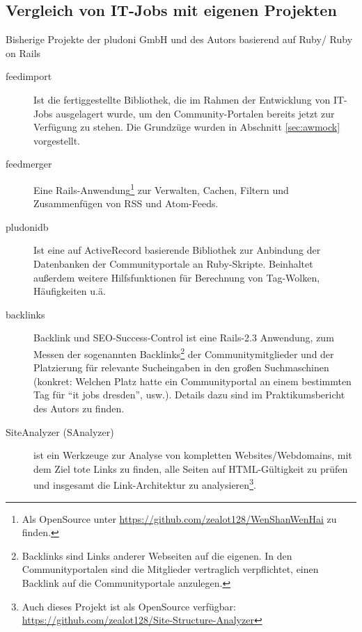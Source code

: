 \subsection{Vergleich von IT-Jobs mit eigenen Projekten}

Bisherige Projekte der pludoni GmbH und des Autors basierend auf Ruby/ Ruby on Rails
\begin{description}
 \item[feedimport] Ist die fertiggestellte Bibliothek, die im Rahmen der Entwicklung von IT-Jobs ausgelagert wurde, um den Community-Portalen bereits jetzt zur Verfügung zu stehen. Die Grundzüge wurden in Abschnitt \ref{sec:awmock} vorgestellt.
 \item[feedmerger] Eine Rails-Anwendung\footnote{ Als OpenSource unter \url{https://github.com/zealot128/WenShanWenHai} zu finden.} zur Verwalten, Cachen, Filtern und Zusammenfügen von RSS und Atom-Feeds.
 \item[pludonidb] Ist eine auf ActiveRecord basierende Bibliothek zur Anbindung der Datenbanken der Communityportale an Ruby-Skripte. Beinhaltet außerdem weitere Hilfsfunktionen für Berechnung von Tag-Wolken, Häufigkeiten u.ä.
 \item[backlinks] Backlink und SEO-Success-Control ist eine Rails-2.3 Anwendung, zum Messen der sogenannten Backlinks\footnote{Backlinks sind Links anderer Webseiten auf die eigenen. In den Communityportalen sind die Mitglieder vertraglich verpflichtet, einen Backlink auf die Communityportale anzulegen.} der Communitymitglieder und der Platzierung für relevante Sucheingaben in den großen Suchmaschinen (konkret: Welchen Platz hatte ein Communityportal an einem bestimmten Tag für "`it jobs dresden"', usw.). Details dazu sind im Praktikumsbericht des Autors zu finden. %

 \item[SiteAnalyzer (SAnalyzer)] ist ein Werkzeuge zur Analyse von kompletten Websites/Webdomains, mit dem Ziel tote Links zu finden, alle Seiten auf HTML-Gültigkeit zu prüfen und insgesamt die Link-Architektur zu analysieren\footnote{Auch dieses Projekt ist als OpenSource verfügbar: \url{https://github.com/zealot128/Site-Structure-Analyzer}}.
\end{description}


